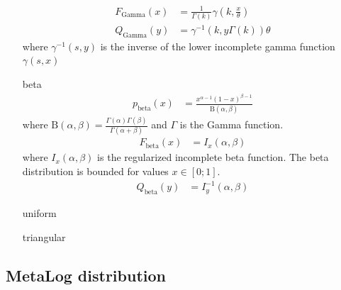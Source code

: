 \begin{itemize}
\begin{align}
F_\mathrm{Gamma}(x)&={\frac {1}{\Gamma (k)}}\gamma \left(k,{\frac {x}{\theta }}\right) \\
Q_\mathrm{Gamma}(y) &= \gamma^{-1}\left(k,y\Gamma(k)\right)\theta
\end{align}
where
$\gamma^{-1}(s,y)$ is the inverse of the lower incomplete gamma function
$\gamma(s,x)$
\item[beta]
\begin{align}
p_\mathrm{beta}(x) &=\frac {x^{\alpha -1}(1-x)^{\beta -1}}{\mathrm {B} (\alpha ,\beta )}
\end{align}
where $\mathrm {B} (\alpha ,\beta )={\frac {\Gamma (\alpha )\Gamma (\beta )}{\Gamma (\alpha +\beta )}}$ and
$\Gamma$ is the Gamma function.
\begin{align}
F_\mathrm{beta}(x) &=I_{x}(\alpha ,\beta )
\end{align}
where $I_{x}(\alpha ,\beta )$ is the regularized incomplete beta function. The beta distribution is bounded for values $x\in [0;1]$.
\begin{align}
Q_\mathrm{beta}(y) &= I^{-1}_{y}(\alpha ,\beta )
\end{align}
\item[uniform]
\item[triangular]
\end{itemize}

\subsection{MetaLog distribution} ~\\

